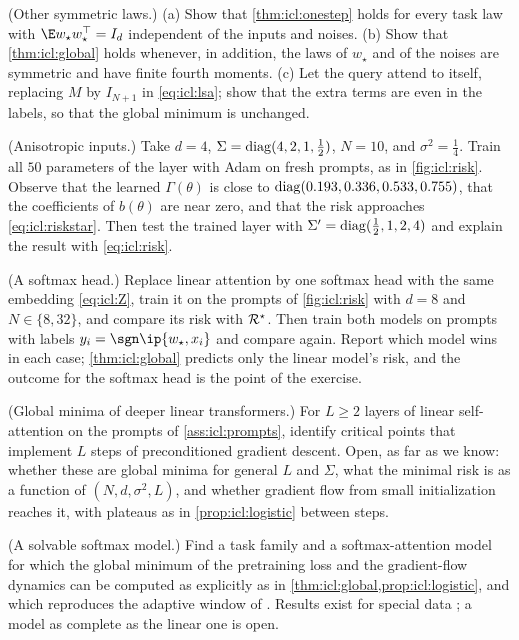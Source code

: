 \begin{refsection}
\begin{exercises}
\item \variation (Other symmetric laws.) (a) Show that \cref{thm:icl:onestep} holds for every task law with $\E w_\star w_\star^\top=I_d$ independent of the inputs and noises. (b) Show that \cref{thm:icl:global} holds whenever, in addition, the laws of $w_\star$ and of the noises are symmetric and have finite fourth moments. (c) Let the query attend to itself, replacing $M$ by $I_{N+1}$ in \eqref{eq:icl:lsa}; show that the extra terms are even in the labels, so that the global minimum is unchanged.\label{ex:icl:symmetric}

\item \simulation (Anisotropic inputs.) Take $d=4$, $\Sigma=\operatorname{diag}(4,2,1,\frac12)$, $N=10$, and $\sigma^2=\frac14$. Train all $50$ parameters of the layer with Adam on fresh prompts, as in \cref{fig:icl:risk}. Observe that the learned $\Gamma(\theta)$ is close to $\operatorname{diag}(0.193,0.336,0.533,0.755)$, that the coefficients of $b(\theta)$ are near zero, and that the risk approaches \eqref{eq:icl:riskstar}. Then test the trained layer with $\Sigma'=\operatorname{diag}(\frac12,1,2,4)$ and explain the result with \eqref{eq:icl:risk}.\label{ex:icl:aniso}

\item \simulation (A softmax head.) Replace linear attention by one softmax head with the same embedding \eqref{eq:icl:Z}, train it on the prompts of \cref{fig:icl:risk} with $d=8$ and $N\in\{8,32\}$, and compare its risk with $\mathcal{R}^\star$. Then train both models on prompts with labels $y_i=\sgn\ip{w_\star,x_i}$ and compare again. Report which model wins in each case; \cref{thm:icl:global} predicts only the linear model's risk, and the outcome for the softmax head is the point of the exercise.\label{ex:icl:softmax}

\item \research\harder (Global minima of deeper linear transformers.) For $L\ge2$ layers of linear self-attention on the prompts of \cref{ass:icl:prompts}, \textcite{AhnEtAl2023} identify critical points that implement $L$ steps of preconditioned gradient descent. Open, as far as we know: whether these are global minima for general $L$ and $\Sigma$, what the minimal risk is as a function of $(N,d,\sigma^2,L)$, and whether gradient flow from small initialization reaches it, with plateaus as in \cref{prop:icl:logistic} between steps.\label{ex:icl:deep}

\item \research (A solvable softmax model.) Find a task family and a softmax-attention model for which the global minimum of the pretraining loss and the gradient-flow dynamics can be computed as explicitly as in \cref{thm:icl:global,prop:icl:logistic}, and which reproduces the adaptive window of \textcite{CollinsEtAl2024}. Results exist for special data \parencite{HuangChengLiang2024}; a model as complete as the linear one is open.\label{ex:icl:researchsoftmax}
\end{exercises}


\end{refsection}
